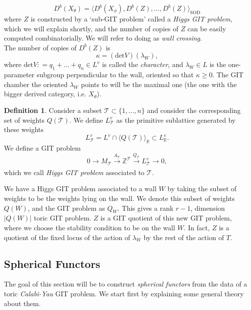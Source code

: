 \documentclass[oneside,reqno]{amsart}
\theoremstyle{definition}
\newtheorem{definition}{Definition}[section]
\theoremstyle{definition}
\theoremstyle{definition}
\theoremstyle{definition}
\newcommand{\defeq}{\mathrel{\mathop:}=}
\newcommand{\Z}{\mathbb{Z}}
\begin{document}
\begin{equation}
\label{wallcrossingformula}
D^b(X_{\theta}) = \langle D^b(X_{\phi}), D^b(Z),\dots, D^b(Z)\rangle_{\text{SOD}}
\end{equation}
where $Z$ is constructed by a `sub-GIT problem' called a \textit{Higgs GIT problem}, which we will explain shortly, and the number of copies of $Z$ can be easily computed combinatorially. We will refer to doing as \textit{wall crossing}. \\
\newline
The number of copies of $D^b(Z)$ is 
\begin{equation}
    \label{wcmult}
    \kappa = (\text{det} V) (\lambda_W),
\end{equation}
where $\text{det} V\defeq q_1 + \dots +q_n \in L^v$ is called the \textit{character}, and $\lambda_W \in L$ is the one-parameter subgroup perpendicular to the wall, oriented so that $\kappa \geq 0$. The GIT chamber the oriented $\lambda_W$ points to will be the maximal one (the one with the bigger derived category, i.e. $X_{\theta}$). 
\begin{definition}
Consider a subset $\mathcal{T} \subset \{1,...,n \}$ and consider the corresponding set of weights $Q(\mathcal{T})$. We define $L_{\mathcal{T}}^v$ as the primitive sublattice generated by these weights
$$L_{\mathcal{T}}^v= L^v \cap \langle  Q(\mathcal{T}) \rangle_{\mathbb{R}} \subset L_{\mathbb{R}}^v.
$$
We define a GIT problem
$$
0 \xrightarrow[]{} M_{\mathcal{T}} \xrightarrow[]{A_{\mathcal{T}}} \Z^\mathcal{T} \xrightarrow[]{Q_{\mathcal{T}}} L^v_{\mathcal{T}} \xrightarrow[]{} 0,
$$
which we call \textit{Higgs GIT problem} associated to $\mathcal{T}$.
\end{definition}
We have a Higgs GIT problem associated to a wall $W$ by taking the subset of weights to be the weights lying on the wall. We denote this subset of weights $Q(W)$, and the GIT problem as $Q_W$. This gives a rank $r-1$, dimension $|Q(W) |$ toric GIT problem. $Z$ is a GIT quotient of this new GIT problem, where we choose the stability condition to be on the wall $W$. In fact, $Z$ is a quotient of the fixed locus of the action of $\lambda_W$ by the rest of the action of $T$.
\subsection{Spherical Functors}
\label{CY}

The goal of this section will be to construct \textit{spherical functors} from the data of a toric \textit{Calabi-Yau} GIT problem. We start first by explaining some general theory about them. 
\end{document}
